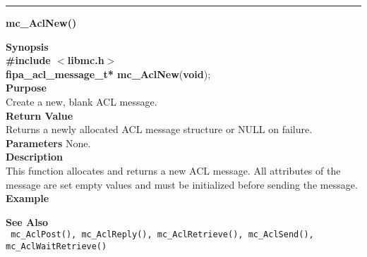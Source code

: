 \noindent
\vspace{5pt}
\rule{6.5in}{0.015in}
\noindent
{}
{\LARGE \bf mc\_AclNew()}\\
\label{api:mc_AclNew()}

\noindent
{\bf Synopsis}\\
{\bf \#include $<$libmc.h$>$}\\
{\bf fipa\_acl\_message\_t* mc\_AclNew}({\bf void});\\

\noindent
{\bf Purpose}\\
Create a new, blank ACL message.\\

\noindent
{\bf Return Value}\\
Returns a newly allocated ACL message structure or NULL on failure.\\

\noindent
{\bf Parameters}
None.\\

\noindent
{\bf Description}\\
This function allocates and returns a new ACL message. All 
attributes of the message are set empty values and must be 
initialized before sending the message.\\

\noindent
{\bf Example}\\
\noindent
{\footnotesize}

\noindent
{\bf See Also}\\
\texttt{
  mc\_AclPost(), mc\_AclReply(), mc\_AclRetrieve(), mc\_AclSend(), 
    \linebreak mc\_AclWaitRetrieve()
}

